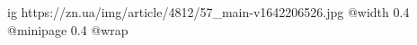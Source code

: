  
 
 
 
 

\ifcmt
  ig https://zn.ua/img/article/4812/57_main-v1642206526.jpg
  @width 0.4
  @minipage 0.4
  @wrap \parpic[r]
\fi
